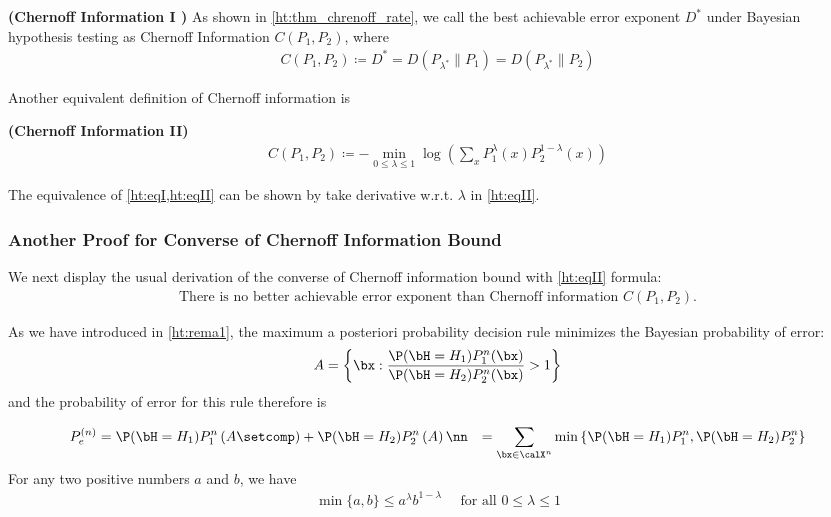 \documentclass{article}
\newcommand{\bfs}[1]{\textbf{({#1})}}
\begin{document}
\begin{defa}{\bfs{Chernoff Information I }} As shown in \cref{ht:thm_chrenoff_rate}, we call the best achievable error exponent $D^{*}$ under Bayesian hypothesis testing as Chernoff Information $C\left(P_{1}, P_{2}\right)$, where
\begin{align}
C\left(P_{1}, P_{2}\right)\coloneqq D^{*}=D\left(P_{\lambda^{*}} \| P_{1}\right)=D\left(P_{\lambda^{*}} \| P_{2}\right)\label{ht:eqI}
\end{align}
\end{defa}
Another equivalent definition of Chernoff information is 
\begin{defa}{\bfs{Chernoff Information II}} 
\begin{align}
C\left(P_{1}, P_{2}\right)\coloneqq -\min _{0 \leq \lambda \leq 1} \log \left(\sum_{x} P_{1}^{\lambda}(x) P_{2}^{1-\lambda}(x)\right)\label{ht:eqII}
\end{align}
\end{defa}

The equivalence of \cref{ht:eqI,ht:eqII} can be shown by take derivative w.r.t. $\lambda$ in  \cref{ht:eqII}.


\subsubsection{Another Proof for Converse of Chernoff Information Bound}\label{ht:sssec_cib}

We next display the usual derivation of the converse of Chernoff information bound with  \cref{ht:eqII} formula:
\begin{align*}
    \text{There is no better achievable error exponent than Chernoff information } C\left(P_{1}, P_{2}\right).
\end{align*}


As we have introduced in \cref{ht:rema1}, the maximum a posteriori probability decision rule minimizes the Bayesian probability of error:
\begin{align}
    A=\left\{ \bx : \frac{\P(\bH = H_1) P^n_{1}( \bx )}{\P(\bH = H_2) P^n_{2}( \bx )}>1\right\}\label{ht:eqmap}
\end{align}
and the probability of error for this rule therefore is

    \begin{align}
        P_{e}^{(n)} &=  \P(\bH = H_1)P_{1}^{n}\left(A\setcomp\right) + \P(\bH = H_2)P_{2}^{n}\left(A\right)\nn
        &=\sum_{\bx\in\calX^n} \min \left\{\P(\bH = H_1) P^n_{1}, \P(\bH = H_2) P^n_{2}\right\}
    \end{align}
For any two positive numbers $a$ and $b$, we have
\begin{align*}
\min \{a, b\} \leq a^{\lambda} b^{1-\lambda} \quad \text { for all } 0 \leq \lambda \leq 1
\end{align*}
\end{document}
